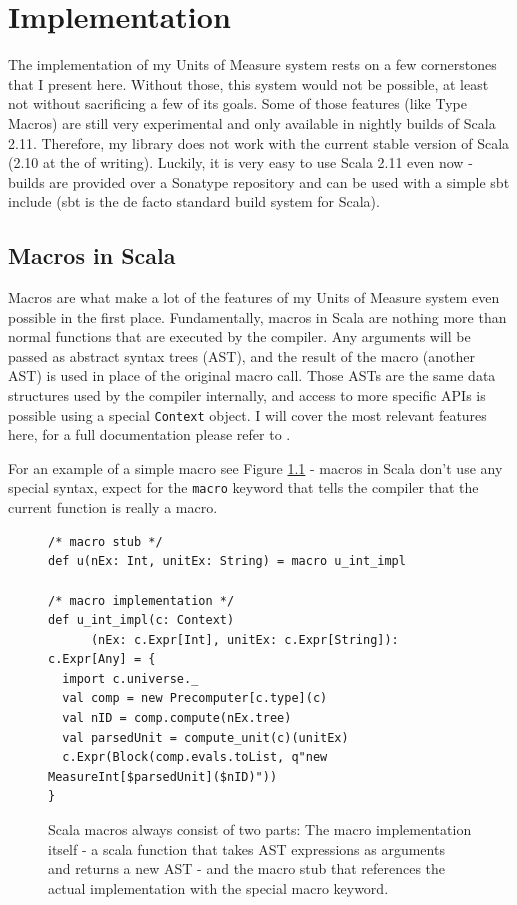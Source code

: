 \documentclass[12pt,oneside,a4paper]{scrbook}
\begin{document}
\chapter{Implementation}

The implementation of my Units of Measure system rests on a few cornerstones that I present here. Without those, this system would not be possible, at least not without sacrificing a few of its goals. Some of those features (like Type Macros) are still very experimental and only available in nightly builds of Scala 2.11. Therefore, my library does not work with the current stable version of Scala (2.10 at the of writing). Luckily, it is very easy to use Scala 2.11 even now - builds are provided over a Sonatype repository and can be used with a simple sbt include (sbt is the de facto standard build system for Scala).

\section{Macros in Scala}

Macros are what make a lot of the features of my Units of Measure system even possible in the first place. Fundamentally, macros in Scala are nothing more than normal functions that are executed by the compiler. Any arguments will be passed as abstract syntax trees (AST), and the result of the macro (another AST) is used in place of the original macro call. Those ASTs are the same data structures used by the compiler internally, and access to more specific APIs is possible using a special \verb|Context| object. I will cover the most relevant features here, for a full documentation please refer to \citep{Eugene13}.

For an example of a simple macro see Figure \ref{code:scala_macro} - macros in Scala don't use any special syntax, expect for the \verb|macro| keyword that tells the compiler that the current function is really a macro.



\begin{figure}
\begin{verbatim}
/* macro stub */
def u(nEx: Int, unitEx: String) = macro u_int_impl

/* macro implementation */
def u_int_impl(c: Context)
      (nEx: c.Expr[Int], unitEx: c.Expr[String]): c.Expr[Any] = {
  import c.universe._
  val comp = new Precomputer[c.type](c)
  val nID = comp.compute(nEx.tree)
  val parsedUnit = compute_unit(c)(unitEx)
  c.Expr(Block(comp.evals.toList, q"new MeasureInt[$parsedUnit]($nID)"))
}
\end{verbatim}
\caption{Scala macros always consist of two parts: The macro implementation itself - a scala function that takes AST expressions as arguments and returns a new AST - and the macro stub that references the actual implementation with the special macro keyword.}
\label{code:scala_macro}
\end{figure}
\end{document}
